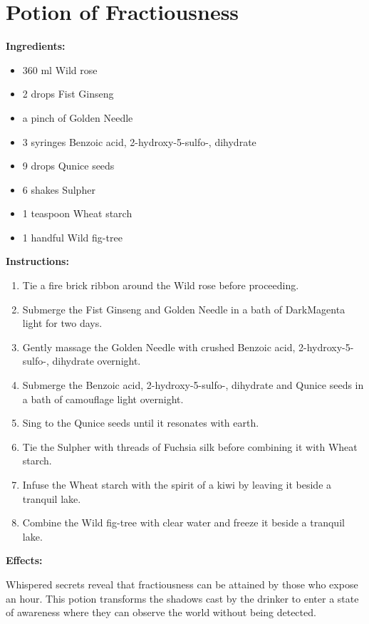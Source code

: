 \documentclass{article}
\begin{document}
\newpage
\section*{Potion of Fractiousness}

\textbf{Ingredients:}

\begin{itemize}
  \item 360 ml Wild rose
  \item 2 drops Fist Ginseng
  \item a pinch of Golden Needle
  \item 3 syringes Benzoic acid, 2-hydroxy-5-sulfo-, dihydrate
  \item 9 drops Qunice seeds
  \item 6 shakes Sulpher
  \item 1 teaspoon Wheat starch
  \item 1 handful Wild fig-tree
\end{itemize}

\textbf{Instructions:}

\begin{enumerate}
  \item Tie a fire brick ribbon around the Wild rose before proceeding.
  \item Submerge the Fist Ginseng and Golden Needle in a bath of DarkMagenta light for two days.
  \item Gently massage the Golden Needle with crushed Benzoic acid, 2-hydroxy-5-sulfo-, dihydrate overnight.
  \item Submerge the Benzoic acid, 2-hydroxy-5-sulfo-, dihydrate and Qunice seeds in a bath of camouflage light overnight.
  \item Sing to the Qunice seeds until it resonates with earth.
  \item Tie the Sulpher with threads of Fuchsia silk before combining it with Wheat starch.
  \item Infuse the Wheat starch with the spirit of a kiwi by leaving it beside a tranquil lake.
  \item Combine the Wild fig-tree with clear water and freeze it beside a tranquil lake.
\end{enumerate}

\textbf{Effects:}

Whispered secrets reveal that fractiousness can be attained by those who expose an hour. This potion transforms the shadows cast by the drinker to enter a state of awareness where they can observe the world without being detected.
\end{document}

